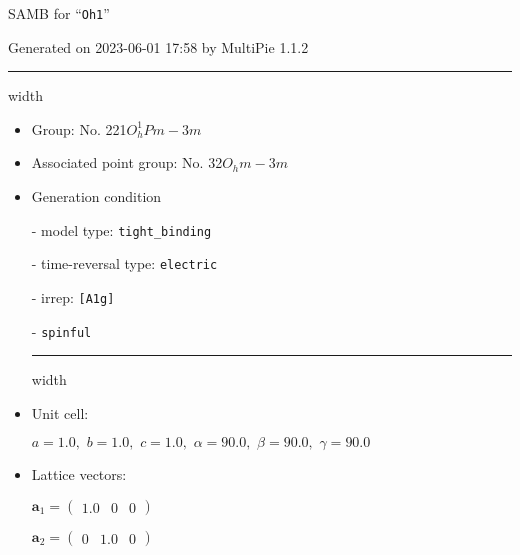 \documentclass[fleqn,10pt,landscape]{article}
\begin{document}
\setcounter{MaxMatrixCols}{16}

\setlength{\baselineskip}{16pt}
\footnotesize
\begin{center}
\LARGE
SAMB for ``\texttt{Oh1}''
\end{center}
\begin{flushright}
Generated on 2023-06-01 17:58 by MultiPie 1.1.2
\end{flushright}
\vspace{1cm}


 \hfil \hrule height 1mm width \textwidth \hfil

\begin{itemize}
\item Group: No. 221\quad$O_{h}^{1}$\quad$Pm-3m$\quad[ cubic ]

\item Associated point group: No. 32\quad$O_{h}$\quad$m-3m$\quad[ cubic ]

\vspace{5mm}

\item Generation condition

\quad - model type: \texttt{tight_binding}

\quad - time-reversal type: \texttt{electric}

\quad - irrep: \texttt{[A1g]}

\quad - \texttt{spinful}


 \hfil \hrule height 1mm width \textwidth \hfil

\item Unit cell:

\quad $a=1.0,\,\, b=1.0,\,\, c=1.0,\,\, \alpha=90.0,\,\, \beta=90.0,\,\, \gamma=90.0$

\item Lattice vectors:

\quad $\bm{a}_1=\begin{pmatrix} 1.0 & 0 & 0 \end{pmatrix}$

\quad $\bm{a}_2=\begin{pmatrix} 0 & 1.0 & 0 \end{pmatrix}$


\end{itemize}
\end{document}
